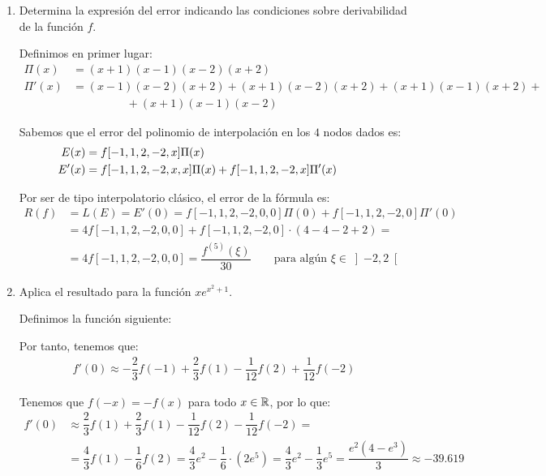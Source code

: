 \begin{ejercicio}
\begin{enumerate}
        \item Determina la expresión del error indicando las condiciones sobre derivabilidad de la función $f$.
        
        Definimos en primer lugar:
        \begin{align*}
            \Pi(x) &= (x+1)(x-1)(x-2)(x+2)\\
            \Pi'(x) &= (x-1)(x-2)(x+2) + (x+1)(x-2)(x+2) + (x+1)(x-1)(x+2) +\\&\hspace{2cm}+ (x+1)(x-1)(x-2)
        \end{align*}

        Sabemos que el error del polinomio de interpolación en los $4$ nodos dados es:
        \begin{align*}
            \hspace{-1cm}E(x) &= f[-1, 1, 2, -2, x]\Pi(x)\\
            \hspace{-1cm}E'(x) &= f[-1, 1, 2, -2, x, x]\Pi(x) + f[-1, 1, 2, -2, x]\Pi'(x)
        \end{align*}

        Por ser de tipo interpolatorio clásico, el error de la fórmula es:
        \begin{align*}
            R(f) &= L(E) = E'(0) = f[-1, 1, 2, -2, 0, 0]\Pi(0) + f[-1, 1, 2, -2, 0]\Pi'(0)\\
            &= 4f[-1, 1, 2, -2, 0, 0] + f[-1, 1, 2, -2, 0]\cdot (4-4-2+2)
            =\\&= 4f[-1, 1, 2, -2, 0, 0] = \dfrac{f^{(5)}(\xi)}{30} \qquad \text{para algún }\xi\in\left]-2,2\right[
        \end{align*}
        
        \item Aplica el resultado para la función $x e^{x^2 + 1}$.
        
        Definimos la función siguiente:

        Por tanto, tenemos que:
        \begin{align*}
            f'(0) \approx -\dfrac{2}{3}f(-1) + \dfrac{2}{3}f(1) - \dfrac{1}{12}f(2) + \dfrac{1}{12}f(-2)
        \end{align*}

        Tenemos que $f(-x)=-f(x)$ para todo $x\in\mathbb{R}$, por lo que:
        \begin{align*}
            f'(0) &\approx \dfrac{2}{3}f(1) + \dfrac{2}{3}f(1) - \dfrac{1}{12}f(2) - \dfrac{1}{12}f(-2)
            =\\&= \dfrac{4}{3}f(1)- \dfrac{1}{6}f(2)
            = \dfrac{4}{3}e^2 - \dfrac{1}{6}\cdot \left(2e^5\right)
            = \dfrac{4}{3}e^2 - \dfrac{1}{3}e^5 = \dfrac{e^2(4-e^3)}{3}\approx -39.619
        \end{align*}
        
    \end{enumerate}
\end{ejercicio}



